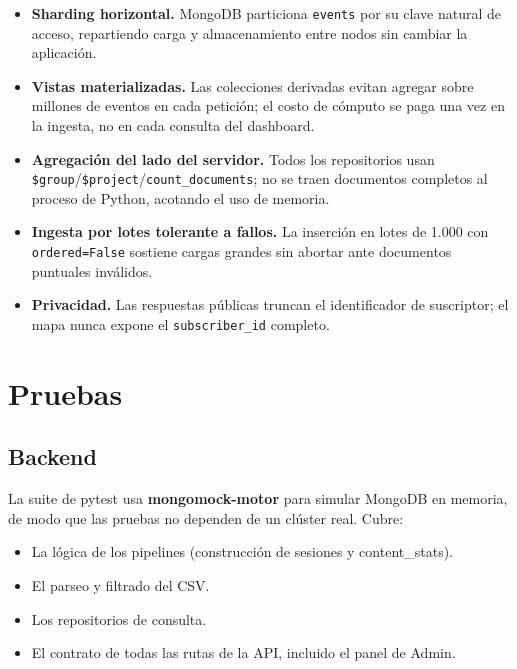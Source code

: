 \documentclass[12pt, letterpaper]{article}
\newcommand{\code}[1]{\texttt{#1}}
\begin{document}
\begin{itemize}[leftmargin=*]
  \item \textbf{Sharding horizontal.} MongoDB particiona \code{events} por su
        clave natural de acceso, repartiendo carga y almacenamiento entre nodos
        sin cambiar la aplicación.
  \item \textbf{Vistas materializadas.} Las colecciones derivadas evitan agregar
        sobre millones de eventos en cada petición; el costo de cómputo se paga
        una vez en la ingesta, no en cada consulta del dashboard.
  \item \textbf{Agregación del lado del servidor.} Todos los repositorios usan
        \code{\$group}/\code{\$project}/\code{count\_documents}; no se traen
        documentos completos al proceso de Python, acotando el uso de memoria.
  \item \textbf{Ingesta por lotes tolerante a fallos.} La inserción en lotes de
        1.000 con \code{ordered=False} sostiene cargas grandes sin abortar ante
        documentos puntuales inválidos.
  \item \textbf{Privacidad.} Las respuestas públicas truncan el identificador de
        suscriptor; el mapa nunca expone el \code{subscriber\_id} completo.
\end{itemize}

\section{Pruebas}
\subsection{Backend}
La suite de pytest usa \textbf{mongomock-motor} para simular MongoDB en memoria,
de modo que las pruebas no dependen de un clúster real. Cubre:

\begin{itemize}[leftmargin=*]
  \item La lógica de los pipelines (construcción de sesiones y content\_stats).
  \item El parseo y filtrado del CSV.
  \item Los repositorios de consulta.
  \item El contrato de todas las rutas de la API, incluido el panel de Admin.
\end{itemize}
\end{document}
